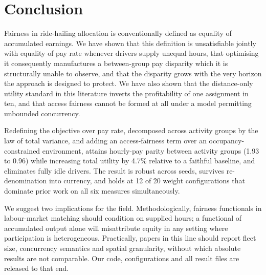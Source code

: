\documentclass[10pt,twocolumn]{article}
\begin{document}
\section{Conclusion}
Fairness in ride-hailing allocation is conventionally defined as equality of accumulated earnings. We have shown that this definition is unsatisfiable jointly with equality of pay rate whenever drivers supply unequal hours, that optimising it consequently manufactures a between-group pay disparity which it is structurally unable to observe, and that the disparity grows with the very horizon the approach is designed to protect. We have also shown that the distance-only utility standard in this literature inverts the profitability of one assignment in ten, and that access fairness cannot be formed at all under a model permitting unbounded concurrency.

Redefining the objective over pay rate, decomposed across activity groups by the law of total variance, and adding an access-fairness term over an occupancy-constrained environment, attains hourly-pay parity between activity groups (1.93 to 0.96) while increasing total utility by 4.7\% relative to a faithful baseline, and eliminates fully idle drivers. The result is robust across seeds, survives re-denomination into currency, and holds at 12 of 20 weight configurations that dominate prior work on all six measures simultaneously.

We suggest two implications for the field. Methodologically, fairness functionals in labour-market matching should condition on supplied hours; a functional of accumulated output alone will misattribute equity in any setting where participation is heterogeneous. Practically, papers in this line should report fleet size, concurrency semantics and spatial granularity, without which absolute results are not comparable. Our code, configurations and all result files are released to that end.


\balance


\end{document}
